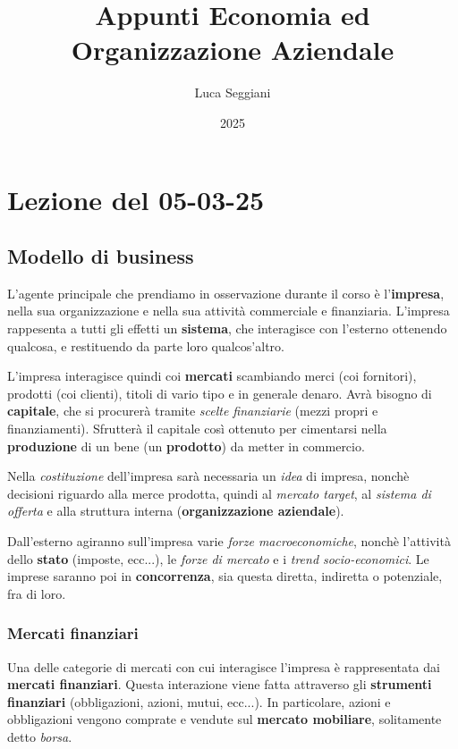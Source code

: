 \documentclass[a4paper,11pt]{article}
\title{Appunti Economia ed Organizzazione Aziendale}
\author{Luca Seggiani}
\date{2025}
\begin{document}
\section{Lezione del 05-03-25}

\thispagestyle{empty}
\pagestyle{fancy}

\subsection{Modello di business}
L'agente principale che prendiamo in osservazione durante il corso è l'\textbf{impresa}, nella sua organizzazione e nella sua attività commerciale e finanziaria.
L'impresa rappesenta a tutti gli effetti un \textbf{sistema}, che interagisce con l'esterno ottenendo qualcosa, e restituendo da parte loro qualcos'altro.

L'impresa interagisce quindi coi \textbf{mercati} scambiando merci (coi fornitori), prodotti (coi clienti), titoli di vario tipo e in generale denaro.
Avrà bisogno di \textbf{capitale}, che si procurerà tramite \textit{scelte finanziarie} (mezzi propri e finanziamenti).
Sfrutterà il capitale così ottenuto per cimentarsi nella \textbf{produzione} di un bene (un \textbf{prodotto}) da metter in commercio.

Nella \textit{costituzione} dell'impresa sarà necessaria un \textit{idea} di impresa, nonchè decisioni riguardo alla merce prodotta, quindi al \textit{mercato target}, al \textit{sistema di offerta} e alla struttura interna (\textbf{organizzazione aziendale}). 

Dall'esterno agiranno sull'impresa varie \textit{forze macroeconomiche}, nonchè l'attività dello \textbf{stato} (imposte, ecc...), le \textit{forze di mercato} e i \textit{trend socio-economici}.
Le imprese saranno poi in \textbf{concorrenza}, sia questa diretta, indiretta o potenziale, fra di loro.

\subsubsection{Mercati finanziari}
Una delle categorie di mercati con cui interagisce l'impresa è rappresentata dai \textbf{mercati finanziari}.
Questa interazione viene fatta attraverso gli \textbf{strumenti finanziari} (obbligazioni, azioni, mutui, ecc...).
In particolare, azioni e obbligazioni vengono comprate e vendute sul \textbf{mercato mobiliare}, solitamente detto \textit{borsa}.
\end{document}
